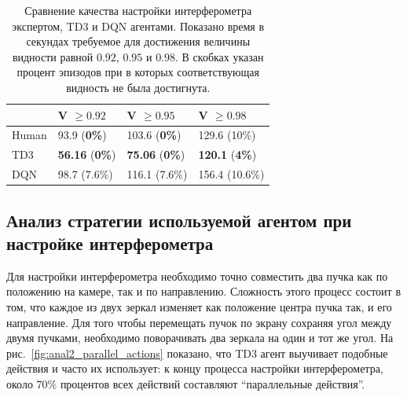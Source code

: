 \begin{table} [htbp]
    \centering
    \begin{threeparttable}
        \caption{Сравнение качества настройки интерферометра экспертом, TD3 и DQN агентами. Показано время в секундах требуемое для достижения величины видности равной $0.92$, $0.95$ и $0.98$. В скобках указан процент эпизодов при в которых соответствующая видность не была достигнута.}\label{tab:human}
        \begin{tabular}{| p{4cm} || p{4cm} || p{4cm} || p{4cm} |}
            \hline
            \hline
            &V $\ge 0.92$ & V $\ge 0.95$ & V $\ge 0.98$ \\
            \hline
            Human &  93.9 (\textbf{0\%})  & 103.6 (\textbf{0\%}) & 129.6 (10\%)\\
            TD3 &  \textbf{56.16} (\textbf{0\%}) & \textbf{75.06} (\textbf{0\%}) & \textbf{120.1} (\textbf{4\%})\\
            DQN &  98.7 (7.6\%) & 116.1 (7.6\%) & 156.4 (10.6\%)\\
            \hline
            \hline
        \end{tabular}
    \end{threeparttable}
\end{table}

\subsection{Анализ стратегии используемой агентом при настройке интерферометра}

Для настройки интерферометра необходимо точно совместить два пучка как по положению на камере, так и по направлению. Сложность этого процесс состоит в том, что каждое из двух зеркал изменяет как положение центра пучка так, и его направление. Для того чтобы перемещать пучок по экрану сохраняя угол между двумя пучками, необходимо поворачивать два зеркала на один и тот же угол. На рис.~\ref{fig:anal2_parallel_actions} показано, что TD3 агент выучивает подобные действия и часто их использует: к концу процесса настройки интерферометра, около 70\% процентов всех действий составляют ``параллельные действия''. 

